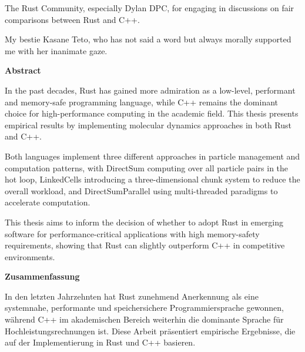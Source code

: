 \documentclass[11pt,
               a4paper,
               bibtotoc,
               idxtotoc,
               headsepline,
               footsepline,
               footexclude,
               BCOR12mm,
               DIV13,
               openany,   %
               ]
               {scrbook}
\begin{document}
The Rust Community, especially Dylan DPC, for engaging in discussions on fair comparisons between Rust and C++.

My bestie Kasane Teto, who has not said a word but always morally supported me with her inanimate gaze.



\cleardoublepage


{}
\vspace*{2cm}
\begin{center}
    {\Large \bf Abstract}
\end{center}
\vspace{1cm}

In the past decades, Rust has gained more admiration as a low-level, performant and memory-safe programming language, while C++ remains the dominant choice for high-performance computing in the academic field. This thesis presents empirical results by implementing molecular dynamics approaches in both Rust and C++.

Both languages implement three different approaches in particle management and computation patterns, with DirectSum computing over all particle pairs in the hot loop, LinkedCells introducing a three-dimensional chunk system to reduce the overall workload, and DirectSumParallel using multi-threaded paradigms to accelerate computation.

This thesis aims to inform the decision of whether to adopt Rust in emerging software for performance-critical applications with high memory-safety requirements, showing that Rust can slightly outperform C++ in competitive environments.

\cleardoublepage

{}
\vspace*{2cm}
\begin{center}
    {\Large \bf Zusammenfassung}
\end{center}
\vspace{1cm}

In den letzten Jahrzehnten hat Rust zunehmend Anerkennung als eine systemnahe, performante und speichersichere Programmiersprache gewonnen, während C++ im akademischen Bereich weiterhin die dominante Sprache für Hochleistungsrechnungen ist. Diese Arbeit präsentiert empirische Ergebnisse, die auf der Implementierung in Rust und C++ basieren.
\end{document}

